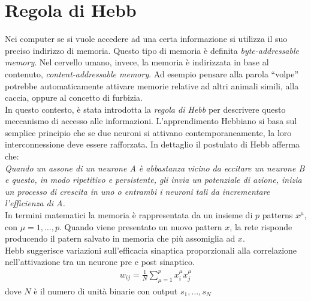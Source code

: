 
\newpage

\section{Regola di Hebb}
Nei computer se si vuole accedere ad una certa informazione si utilizza il suo preciso indirizzo di memoria. Questo tipo di memoria è definita \emph{byte-addressable memory}. Nel cervello umano, invece, la memoria è indirizzata in base al contenuto, \emph{content-addressable memory}. Ad esempio pensare alla parola “volpe” potrebbe automaticamente attivare memorie relative ad altri animali simili, alla caccia, oppure al concetto di furbizia.\\

In questo contesto, è stata introdotta la \emph{regola di Hebb} per descrivere questo meccanismo di accesso alle informazioni. L'apprendimento Hebbiano si basa sul semplice principio che se due neuroni si attivano contemporaneamente, la loro interconnessione deve essere rafforzata. In dettaglio il postulato di Hebb afferma che:\\

\emph{Quando un assone di un neurone A è abbastanza vicino da eccitare un neurone B e questo, in modo ripetitivo e persistente, gli invia un potenziale di azione, inizia un processo di crescita in uno o entrambi i neuroni tali da incrementare l'efficienza di A.}\\

In termini matematici la memoria è rappresentata da un insieme di $p$ patterns $x^\mu$, con $\mu=1,\dots,p$. Quando viene presentato un nuovo pattern $x$, la rete risponde producendo il patern salvato in memoria che più assomiglia ad $x$.\\

Hebb suggerisce variazioni sull'efficacia sinaptica proporzionali alla correlazione nell'attivazione tra un neurone pre e post sinaptico.
\begin{align}
	w_{ij} = \frac{1}{N} \sum_{\mu = 1}^p x_i^\mu x_j^\mu
\end{align}
dove $N$ è il numero di unità binarie con output $s_1, \dots, s_N$


